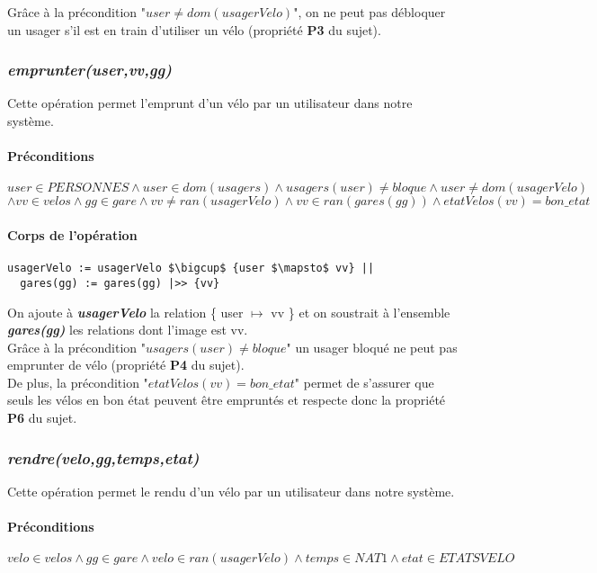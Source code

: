 \documentclass[12pt]{article}
\begin{document}
Grâce à la précondition "$user \neq dom(usagerVelo)$", on ne peut pas débloquer un usager s'il est en train d'utiliser un vélo (propriété \textbf{P3} du sujet).
\subsubsection{\textit{emprunter(user,vv,gg)}}
Cette opération permet l'emprunt d'un vélo par un utilisateur dans notre système.
\paragraph{Préconditions}
\[ user \in PERSONNES \land user \in dom(usagers) \land usagers(user) \neq bloque \land user \neq dom(usagerVelo) \]\[\land vv \in velos \land gg \in gare \land vv \neq ran(usagerVelo) \land vv \in ran(gares(gg)) \land etatVelos(vv) = bon\_etat\]
\paragraph{Corps de l'opération}
\textbf{}
\begin{lstlisting}[mathescape]
  usagerVelo := usagerVelo $\bigcup$ {user $\mapsto$ vv} ||
  gares(gg) := gares(gg) |>> {vv}
\end{lstlisting}

On ajoute à \textit{\textbf{usagerVelo}} la relation \{ user $\mapsto$ vv \} et on soustrait à l'ensemble \textit{\textbf{gares(gg)}} les relations dont l'image est vv.\\

Grâce à la précondition "$usagers(user) \neq bloque$" un usager bloqué ne peut pas emprunter de vélo (propriété \textbf{P4} du sujet).\\

De plus, la précondition "$etatVelos(vv) = bon\_etat$" permet de s'assurer que seuls les vélos en bon état peuvent être empruntés et respecte donc la propriété \textbf{P6} du sujet.
\subsubsection{\textit{rendre(velo,gg,temps,etat)}}
Cette opération permet le rendu d'un vélo par un utilisateur dans notre système.
\paragraph{Préconditions}
\[ velo \in velos \land gg \in gare \land velo \in ran(usagerVelo) \land temps \in NAT1 \land etat \in ETATSVELO\]
\end{document}
